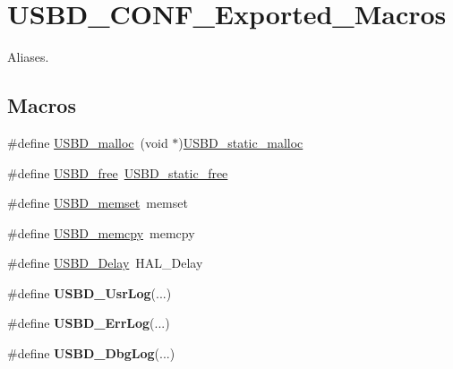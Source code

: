 \hypertarget{group__USBD__CONF__Exported__Macros}{}\section{U\+S\+B\+D\+\_\+\+C\+O\+N\+F\+\_\+\+Exported\+\_\+\+Macros}
\label{group__USBD__CONF__Exported__Macros}


Aliases.  


\subsection*{Macros}
\begin{DoxyCompactItemize}
\item 
\#define \hyperlink{group__USBD__CONF__Exported__Macros_ga35ff353194f56823357f503e546ccf4b}{U\+S\+B\+D\+\_\+malloc}~(void $\ast$)\hyperlink{group__USBD__CONF__Exported__FunctionsPrototype_ga2df01b9aae6026e9f6b55da3b1e72aee}{U\+S\+B\+D\+\_\+static\+\_\+malloc}
\item 
\#define \hyperlink{group__USBD__CONF__Exported__Macros_gab44fcf9b4d7bfbe8b1308eca76975fe5}{U\+S\+B\+D\+\_\+free}~\hyperlink{group__USBD__CONF__Exported__FunctionsPrototype_ga92ed1214efe53f54b3586a6233cfa5a6}{U\+S\+B\+D\+\_\+static\+\_\+free}
\item 
\#define \hyperlink{group__USBD__CONF__Exported__Macros_gaf7b31857d15ef0abbd84e0e70a2b903f}{U\+S\+B\+D\+\_\+memset}~memset
\item 
\#define \hyperlink{group__USBD__CONF__Exported__Macros_ga18d9c17ef2afe7244b559ed428ca1e81}{U\+S\+B\+D\+\_\+memcpy}~memcpy
\item 
\#define \hyperlink{group__USBD__CONF__Exported__Macros_ga78993b66136329032c26d0c13a78e963}{U\+S\+B\+D\+\_\+\+Delay}~H\+A\+L\+\_\+\+Delay
\item 
\mbox{\label{group__USBD__CONF__Exported__Macros_gad0adad09bbf4f06418659a39edc0f6c6}} 
\#define {\bfseries U\+S\+B\+D\+\_\+\+Usr\+Log}(...)
\item 
\mbox{\label{group__USBD__CONF__Exported__Macros_ga077a76b66987212e70c3c4db2ca73a8b}} 
\#define {\bfseries U\+S\+B\+D\+\_\+\+Err\+Log}(...)
\item 
\mbox{\label{group__USBD__CONF__Exported__Macros_ga009d0ba418c356a4668fac6115b07ac5}} 
\#define {\bfseries U\+S\+B\+D\+\_\+\+Dbg\+Log}(...)
\end{DoxyCompactItemize}


